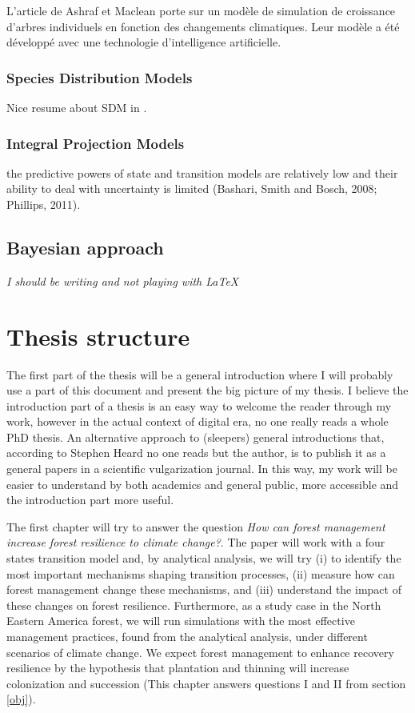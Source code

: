  L’article de Ashraf et Maclean porte sur un modèle de simulation de croissance d’arbres individuels en fonction des changements climatiques.  Leur modèle a été développé avec une technologie d’intelligence artificielle.

\subsubsection{Species Distribution Models}\label{sdm}

Nice resume about SDM in \textcite{Moran-Ordonez2016}.


\subsubsection{Integral Projection Models}

the predictive powers of state and transition models are relatively low and their ability to deal with uncertainty is limited (Bashari, Smith and Bosch, 2008; Phillips, 2011).

\subsection{Bayesian approach}

\textit{I should be writing and not playing with \LaTeX}

\section{Thesis structure}

The first part of the thesis will be a general introduction where I will probably use a part of this document and present the big picture of my thesis.
I believe the introduction part of a thesis is an easy way to welcome the reader through my work, however in the actual context of digital era, no one really reads a whole PhD thesis.
An alternative approach to (sleepers) general introductions that, according to Stephen Heard\footnotemark{} no one reads but the author, is to publish it as a general papers in a scientific vulgarization journal.
In this way, my work will be easier to understand by both academics and general public, more accessible and the introduction part more useful.

The first chapter will try to answer the question \textit{How can forest management increase forest resilience to climate change?}.
The paper will work with a four states transition model and, by analytical analysis, we will try (i) to identify the most important mechanisms shaping transition processes, (ii) measure how can forest management change these mechanisms, and (iii) understand the impact of these changes on forest resilience.
Furthermore, as a study case in the North Eastern America forest, we will run simulations with the most effective management practices, found from the analytical analysis, under different scenarios of climate change.
We expect forest management to enhance recovery resilience by the hypothesis that plantation and thinning will increase colonization and succession (This chapter answers questions I and II from section \ref{obj}).

